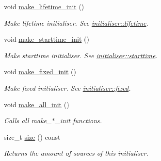 \begin{DoxyCompactItemize}
void \hyperlink{classphysim_1_1init_1_1multisource_a5eac947010c79300e4aa80b374edd129}{make\+\_\+lifetime\+\_\+init} ()
\begin{DoxyCompactList}\small\item\em Make lifetime initialiser. See \hyperlink{classphysim_1_1init_1_1initialiser_ac137b5089b9beca078e08b2bcdf0d54c}{initialiser\+::lifetime}. \end{DoxyCompactList}\item 
void \hyperlink{classphysim_1_1init_1_1multisource_adf2deaa3069a402b578d461b620d71e9}{make\+\_\+starttime\+\_\+init} ()
\begin{DoxyCompactList}\small\item\em Make starttime initialiser. See \hyperlink{classphysim_1_1init_1_1initialiser_a651ed09452c1621cec2ca7f52073f53f}{initialiser\+::starttime}. \end{DoxyCompactList}\item 
void \hyperlink{classphysim_1_1init_1_1multisource_a76a07d9c40c1b816efa0a20285f3c46f}{make\+\_\+fixed\+\_\+init} ()
\begin{DoxyCompactList}\small\item\em Make fixed initialiser. See \hyperlink{classphysim_1_1init_1_1initialiser_a0deb0d7e29b824274c4cd81306b42465}{initialiser\+::fixed}. \end{DoxyCompactList}\item 
\mbox{\label{classphysim_1_1init_1_1multisource_a48e4fd674c2ee2d4209ef9be97105fa2}} 
void \hyperlink{classphysim_1_1init_1_1multisource_a48e4fd674c2ee2d4209ef9be97105fa2}{make\+\_\+all\+\_\+init} ()
\begin{DoxyCompactList}\small\item\em Calls all make\+\_\+$\ast$\+\_\+init functions. \end{DoxyCompactList}\item 
\mbox{\label{classphysim_1_1init_1_1multisource_aece8508cfe9fdceb63a21a2001a9e6e3}} 
size\+\_\+t \hyperlink{classphysim_1_1init_1_1multisource_aece8508cfe9fdceb63a21a2001a9e6e3}{size} () const
\begin{DoxyCompactList}\small\item\em Returns the amount of sources of this initialiser. \end{DoxyCompactList}\item 
\mbox{\label{classphysim_1_1init_1_1multisource_a075bc9637cb8b843253fade495de87c3}} 

\end{DoxyCompactItemize}
